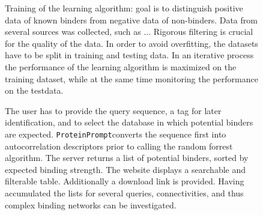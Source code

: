 \documentclass{article}
\newcommand{\toolblank}{\texttt{ProteinPrompt}}
\newcommand{\tool}{\toolblank\hspace{2pt}}
\begin{document}
\begin{figure}
  
  \caption{Training of the learning algorithm: goal is to distinguish positive data of known binders from negative data of non-binders. Data from several sources was collected, such as ... Rigorous filtering is crucial for the quality of the data. In order to avoid overfitting, the datasets have to be split in training and testing data. In an iterative process the performance of the learning algorithm is maximized on the training dataset, while at the same time monitoring the performance on the testdata. }
\end{figure}


\begin{figure}
  
  \caption{The user has to provide the query sequence, a tag for later identification, and to select the database in which potential binders are expected. \tool converts the sequence first into autocorrelation descriptors prior to calling the random forrest algorithm. The server returns a list of potential binders, sorted by expected binding strength. The website displays a searchable and filterable table. Additionally a download link is provided. Having accumulated the lists for several queries, connectivities, and thus complex binding networks can be investigated. }
\end{figure}




\end{document}

